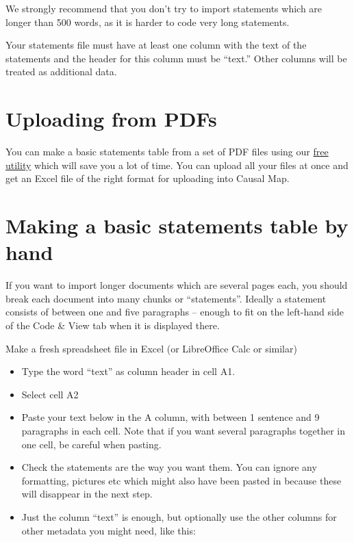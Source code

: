 \documentclass[
]{book}
\providecommand{\tightlist}{%
  \setlength{\itemsep}{0pt}\setlength{\parskip}{0pt}}
\begin{document}
We strongly recommend that you don't try to import statements which are longer than 500 words, as it is harder to code very long statements.

Your statements file must have at least one column with the text of the statements and the header for this column must be ``text.'' Other columns will be treated as additional data.

\hypertarget{uploading-from-pdfs}{%
\section{Uploading from PDFs}\label{uploading-from-pdfs}}

You can make a basic statements table from a set of PDF files using our \href{https://causalmap.shinyapps.io/pdf2excel/}{free utility} which will save you a lot of time. You can upload all your files at once and get an Excel file of the right format for uploading into Causal Map.

\hypertarget{making-a-basic-statements-table-by-hand}{%
\section{Making a basic statements table by hand}\label{making-a-basic-statements-table-by-hand}}

If you want to import longer documents which are several pages each, you should break each document into many chunks or ``statements''. Ideally a statement consists of between one and five paragraphs -- enough to fit on the left-hand side of the Code \& View tab when it is displayed there.

Make a fresh spreadsheet file in Excel (or LibreOffice Calc or similar)

\begin{itemize}
\tightlist
\item
  Type the word ``text'' as column header in cell A1.
\item
  Select cell A2
\item
  Paste your text below in the A column, with between 1 sentence and 9 paragraphs in each cell. Note that if you want several paragraphs together in one cell, be careful when pasting.
\item
  Check the statements are the way you want them. You can ignore any formatting, pictures etc which might also have been pasted in because these will disappear in the next step.
\item
  Just the column ``text'' is enough, but optionally use the other columns for other metadata you might need, like this:
\end{itemize}
\end{document}
